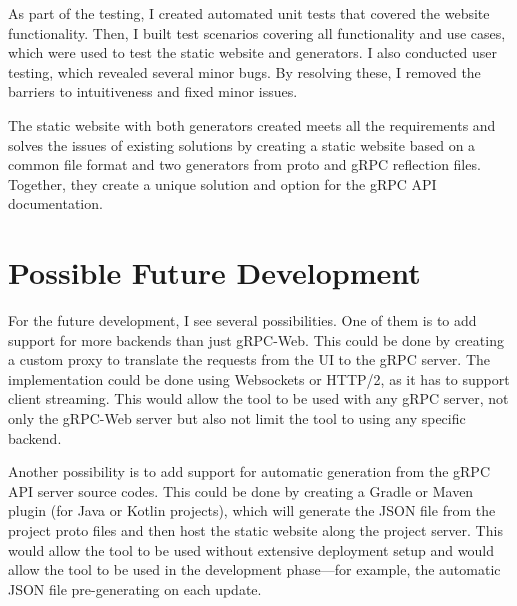 As part of the testing, I created automated unit tests that covered the website functionality.
Then, I built test scenarios covering all functionality and use cases, which were used to test the static website and generators.
I also conducted user testing, which revealed several minor bugs.
By resolving these, I removed the barriers to intuitiveness and fixed minor issues.

The static website with both generators created meets all the requirements and solves the issues of existing solutions by creating a static website based on a common file format and two generators from proto and gRPC reflection files.
Together, they create a unique solution and option for the gRPC API documentation.


\section{Possible Future Development}
For the future development, I see several possibilities.
One of them is to add support for more backends than just gRPC-Web.
This could be done by creating a custom proxy to translate the requests from the UI to the gRPC server.
The implementation could be done using Websockets or HTTP/2, as it has to support client streaming.
This would allow the tool to be used with any gRPC server, not only the gRPC-Web server but also not limit the tool to using any specific backend.

Another possibility is to add support for automatic generation from the gRPC API server source codes.
This could be done by creating a Gradle or Maven plugin (for Java or Kotlin projects), which will generate the JSON file from the project proto files and then host the static website along the project server.
This would allow the tool to be used without extensive deployment setup and would allow the tool to be used in the development phase—for example, the automatic JSON file pre-generating on each update.